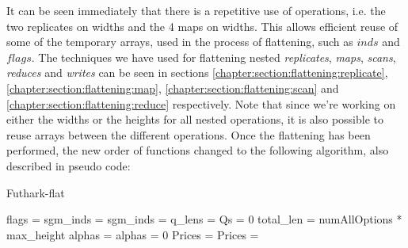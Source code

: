 It can be seen immediately that there is a repetitive use of operations, i.e. the two replicates on widths and the 4 maps on widths. This allows efficient reuse of some of the temporary arrays, used in the process of flattening, such as $\mathit{inds}$ and $\mathit{flags}$. The techniques we have used for flattening nested \textit{replicates}, \textit{maps}, \textit{scans}, \textit{reduces} and \textit{writes} can be seen in sections \ref{chapter:section:flattening:replicate},  \ref{chapter:section:flattening:map}, \ref{chapter:section:flattening:scan} and
\ref{chapter:section:flattening:reduce} respectively. Note that since we're working on either the widths or the heights for all nested operations, it is also possible to reuse arrays between the different operations. Once the flattening has been performed, the new order of functions changed to the following algorithm, also described in pseudo code:
\newpage
\begin{algorithm}[H]
\DontPrintSemicolon
\caption{Futhark-flat\label{alg:futhark-flat}}
flags = 
sgm\_inds = \;
sgm\_inds = 
q\_lens = 
Qs =  0
total\_len = numAllOptions * max\_height
alphas = 
alphas =  0
\;
\;
Prices = 
Prices = 
 

\end{algorithm}

